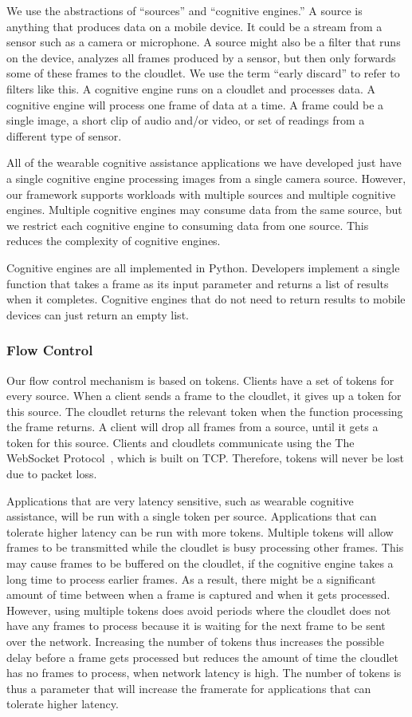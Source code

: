 We use the abstractions of ``sources'' and ``cognitive engines.'' A source is
anything that produces data on a mobile device. It could be a stream from a
sensor such as a camera or microphone. A source might also be a filter that runs
on the device, analyzes all frames produced by a sensor, but then only forwards
some of these frames to the
cloudlet. We use the term ``early discard'' to refer to filters like
this. A cognitive engine runs on a cloudlet and processes data. A cognitive
engine will process one frame of data at a time. A frame could be a single
image, a short clip of audio and/or video, or set of readings from a different
type of sensor.

All of the wearable cognitive assistance applications we have developed just
have a single cognitive engine processing images from a single camera source.
However, our framework supports workloads with multiple sources and multiple
cognitive engines. Multiple cognitive engines may consume data from the same
source, but we restrict each cognitive engine to consuming data from one source.
This reduces the complexity of cognitive engines.

Cognitive engines are all implemented in Python. Developers implement a single
function that takes a frame as its input parameter and returns a list of
results when it completes. Cognitive engines that do not need to return results
to mobile devices can just return an empty list.

\subsubsection{Flow Control}

Our flow control mechanism is
based on tokens. Clients have a set of tokens for every source. When a client
sends a frame to the cloudlet, it gives up a token for this source. The cloudlet
returns the relevant token when the function processing the frame returns.
A client will drop all frames from a source, until it gets a token for this
source. Clients and
cloudlets communicate using the The WebSocket Protocol~\cite{websocket}, which
is built on TCP.
Therefore, tokens will never be lost due to packet loss.

Applications that are very latency sensitive, such as
wearable cognitive assistance, will be run with a single token per source.
Applications that can tolerate higher latency can be run with more tokens.
Multiple tokens
will allow frames to be transmitted while the cloudlet is busy processing other
frames. This may cause frames to be buffered on the cloudlet, if the
cognitive engine takes a long time to process earlier frames. As a result, there
might be a significant amount of time between when a frame is captured and when
it gets processed. However, using multiple tokens does avoid periods where the
cloudlet does not have any frames to process because it is waiting for the next
frame to be sent over the network. Increasing
the number of tokens thus increases the possible delay before a frame gets
processed but reduces the amount of time the cloudlet has no frames to process,
when network latency is high.
The number of tokens is thus a parameter that will
increase the framerate for applications that can tolerate higher latency.

